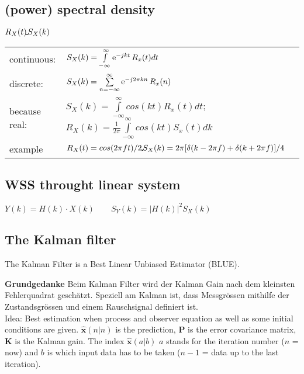 \subsection{(power) spectral density}	
$R_X(t)\FT S_X(k)$ \\
\begin{tabular}{ll}
	continuous:		&	$S_X(k)=\int\limits_{-\infty}^{\infty}{\operatorname{\mathrm e}^{-j k t}R_x(t)dt}$	\\
	discrete: 		&	$S_X(k)=\sum\limits_{n=-\infty}^{\infty}{\operatorname{\mathrm e}^{-j 2\pi k n}R_x(n)}$	 \\
	because real:	&	$S_X(k)=\int\limits_{-\infty}^{\infty}{cos(kt)R_x(t)dt}$; \qquad $R_X(k)=\frac{1}{2\pi}\int\limits_{-\infty}^{\infty}{cos(kt)S_x(t)dk}$	\\
	\hline
	example			&	$R_X(t)=cos(2\pi f t)/2 \FT S_X(k)=2\pi [\delta(k-2\pi f)+ \delta(k+2\pi f)]/4$ \\
\end{tabular}	

\subsection{WSS throught linear system }

$\boxed{Y(k)=H(k)\cdot X(k)} \qquad \boxed{S_Y(k)=|H(k)|^2 S_X(k)}$


\subsection{The Kalman filter }
The Kalman Filter is a Best Linear Unbiased Estimator (BLUE).

\textbf{Grundgedanke} Beim Kalman Filter wird der Kalman Gain nach dem
kleinsten Fehlerquadrat geschätzt. Speziell am Kalman ist, dass Messgrössen
mithilfe der Zustandsgrössen und einem Rauschsignal definiert ist. \\
Idea: Best estimation when process and observer equation as well as some initial conditions are given.
$\mathbf{\hat x}(n|n)$ is the prediction, $\mathbf{P}$ is the error covariance matrix, $\mathbf{K}$ is the Kalman gain.
The index $\mathbf{\hat x}(a|b)$ $a$ stands for the iteration number ($n$ = now) and $b$ is which input
data has to be taken ($n-1$ = data up to the last iteration).

